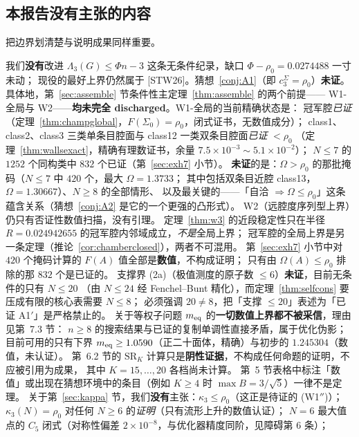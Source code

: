 \documentclass[UTF8,11pt]{ctexart}
\theoremstyle{definition}
\newcommand{\Lam}{\Lambda}
\newcommand{\STW}{\textup{[STW26]}}
\begin{document}
\subsection{本报告没有主张的内容}

把边界划清楚与说明成果同样重要。

我们\textbf{没有}改进 $\Lam_3(G)\le\Phi n-3$ 这条无条件纪录，缺口 $\Phi-\rho_0=0.0274488$ 一寸未动；
现役的最好上界仍然属于 \STW。猜想~\ref{conj:A1}（即 $c_3^{\Sigma}=\rho_0$）\textbf{未证}。
具体地，第~\ref{sec:assemble} 节条件性主定理~\ref{thm:assemble} 的两个前提——
W1-全局与 W2——\textbf{均未完全 discharged}。W1-全局的当前精确状态是：
冠军腔\emph{已证}（定理~\ref{thm:champglobal}，$F(\Sigma_0)=\rho_0$，闭式证书，无数值成分）；
class1、class2、class3 三类单条目腔面与 class12 一类双条目腔面\emph{已证} $<\rho_0$
（定理~\ref{thm:wallsexact}，精确有理数证书，余量 $7.5\times10^{-3}\sim5.1\times10^{-2}$）；
$N\le7$ 的 $1252$ 个同构类中 $832$ 个已证（第~\ref{sec:exh7} 小节）。
\textbf{未证}的是：$\Omega>\rho_0$ 的那批掩码（$N\le7$ 中 $420$ 个，最大 $\Omega=1.3733$；
其中包括双条目近腔 class13，$\Omega=1.30667$）、$N\ge8$ 的全部情形、
以及最关键的——「自洽 $\Rightarrow\Omega\le\rho_0$」这条蕴含关系（猜想~\ref{conj:A2} 是它的一个更强的凸形式）。
W2（远腔度序列型上界）仍只有否证性数值扫描，没有引理。
定理~\ref{thm:w3} 的近段稳定性只在半径 $R=0.024942655$ 的冠军腔内邻域成立，\emph{不是}全局上界；
冠军腔的全局上界是另一条定理（推论~\ref{cor:chamberclosed}），两者不可混用。
第~\ref{sec:exh7} 小节中对 $420$ 个掩码计算的 $F(A)$ 值全部是\textbf{数值}，不构成证明；
只有由 $\Omega(A)\le\rho_0$ 排除的那 $832$ 个是已证的。
支撑界 (2a)（极值测度的原子数 $\le6$）\textbf{未证}，目前无条件的只有 $N\le20$
（由 $N\le24$ 经 Fenchel--Bunt 精化），而定理~\ref{thm:selfcons} 要压成有限的核心表需要 $N\le8$；
必须强调 $20\ne8$，把「支撑 $\le20$」表述为「已证 A1$'$」是严格禁止的。
关于等权子问题 $m_{\rm eq}$ 的\textbf{一切数值上界都不被采信}，理由见第~7.3 节：
$n\ge8$ 的搜索结果与已证的复制单调性直接矛盾，属于优化伪影；
目前可用的只有下界 $m_{\rm eq}\ge1.0590$（正二十面体，精确）与初步的 $1.245304$（数值，未认证）。
第~6.2 节的 $\mathrm{SR}_K$ 计算只是\textbf{阴性证据}，不构成任何命题的证明，不应被引用为成果，
其中 $K=15,\dots,20$ 各档尚未计算。
第~5 节表格中标注「数值」或出现在猜想环境中的条目（例如 $K\ge4$ 时 $\max B=3/\sqrt5$）一律不是定理。
关于第~\ref{sec:kappa} 节，我们\textbf{没有}主张：$\kappa_3\le\rho_0$（这正是待证的 (W1$''$)）；
$\kappa_3(N)=\rho_0$ 对任何 $N\ge6$ 的\emph{证明}（只有流形上升的数值认证）；
$N=6$ 最大值点的 $C_5$ 闭式（对称性偏差 $2\times10^{-8}$，与优化器精度同阶，见障碍第 6 条）；
\end{document}
